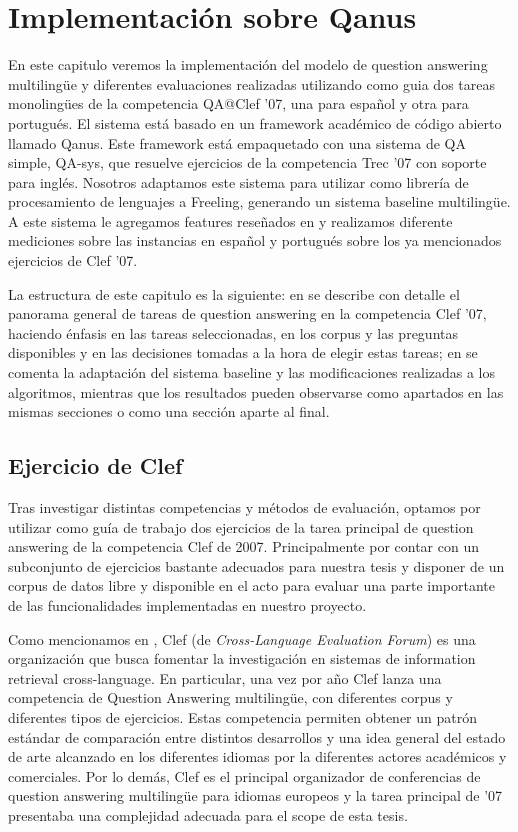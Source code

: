 \chapter{Implementación sobre Qanus}
\label{chap:qanus} \label{chap:5}
\faltadependiente
En este capitulo veremos la implementación del modelo de question answering multilingüe y diferentes evaluaciones realizadas utilizando como guia dos tareas monolingües de la competencia QA@Clef '07, una para español y otra para portugués. El sistema está basado en un framework académico de código abierto llamado Qanus. Este framework está empaquetado con una sistema de QA simple, QA-sys, que resuelve ejercicios de la competencia Trec '07 con soporte para inglés. Nosotros adaptamos este sistema para utilizar como librería de procesamiento de lenguajes a Freeling, generando un sistema baseline multilingüe. A este sistema le agregamos features reseñados en  y realizamos diferente mediciones sobre las instancias en español y portugués sobre los ya mencionados ejercicios de Clef '07.

La estructura de este capitulo es la siguiente: en  se describe con detalle el panorama general de tareas de question answering en la competencia Clef '07, haciendo énfasis en las tareas seleccionadas, en los corpus y las preguntas disponibles y en las decisiones tomadas a la hora de elegir estas tareas; en  se comenta la adaptación del sistema baseline y las modificaciones realizadas a los algoritmos, {\color{red}mientras que los resultados pueden observarse como apartados en las mismas secciones o como una sección aparte al final}.

\section{Ejercicio de Clef}
\label{sec:ejecicio-de-clef}
Tras investigar distintas competencias y métodos de evaluación, optamos por utilizar como guía de trabajo dos ejercicios de la tarea principal de question answering de la competencia Clef de 2007. Principalmente por contar con un subconjunto de ejercicios bastante adecuados para nuestra tesis y disponer de un corpus de datos libre y disponible en el acto para evaluar una parte importante de las funcionalidades implementadas en nuestro proyecto. 

Como mencionamos en , Clef (de \textit{Cross-Language Evaluation Forum}) es una organización que busca fomentar la investigación en sistemas de information retrieval cross-language. En particular, una vez por año Clef lanza una competencia de Question Answering multilingüe, con diferentes corpus y diferentes tipos de ejercicios. Estas competencia permiten obtener un patrón estándar de comparación entre distintos desarrollos y una idea general del estado de arte alcanzado en los diferentes idiomas por la diferentes actores académicos y comerciales. Por lo demás, Clef es el principal organizador de conferencias de question answering multilingüe para idiomas europeos y la tarea principal de '07 presentaba una complejidad adecuada para el scope de esta tesis.

